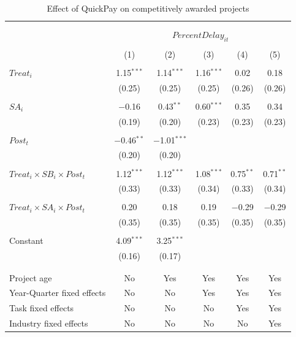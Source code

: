\documentclass[
]{article}
\begin{document}
\begin{table}[H] \centering 
  \caption{Effect of QuickPay on competitively awarded projects} 
  \label{} 
\small 
\begin{tabular}{@{\extracolsep{-2pt}}lccccc} 
\\[-1.8ex]\hline 
\hline \\[-1.8ex] 
\\[-1.8ex] & \multicolumn{5}{c}{$PercentDelay_{it}$  } \\ 
\\[-1.8ex] & (1) & (2) & (3) & (4) & (5)\\ 
\hline \\[-1.8ex] 
 $Treat_i$ & 1.15$^{***}$ & 1.14$^{***}$ & 1.16$^{***}$ & 0.02 & 0.18 \\ 
  & (0.25) & (0.25) & (0.25) & (0.26) & (0.26) \\ 
  & & & & & \\ 
 $SA_i$ & $-$0.16 & 0.43$^{**}$ & 0.60$^{***}$ & 0.35 & 0.34 \\ 
  & (0.19) & (0.20) & (0.23) & (0.23) & (0.23) \\ 
  & & & & & \\ 
 $Post_t$ & $-$0.46$^{**}$ & $-$1.01$^{***}$ &  &  &  \\ 
  & (0.20) & (0.20) &  &  &  \\ 
  & & & & & \\ 
 $Treat_i \times SB_i \times Post_t$ & 1.12$^{***}$ & 1.12$^{***}$ & 1.08$^{***}$ & 0.75$^{**}$ & 0.71$^{**}$ \\ 
  & (0.33) & (0.33) & (0.34) & (0.33) & (0.34) \\ 
  & & & & & \\ 
 $Treat_i \times SA_i \times Post_t$ & 0.20 & 0.18 & 0.19 & $-$0.29 & $-$0.29 \\ 
  & (0.35) & (0.35) & (0.35) & (0.35) & (0.35) \\ 
  & & & & & \\ 
 Constant & 4.09$^{***}$ & 3.25$^{***}$ &  &  &  \\ 
  & (0.16) & (0.17) &  &  &  \\ 
  & & & & & \\ 
\hline \\[-1.8ex] 
Project age & No & Yes & Yes & Yes & Yes \\ 
Year-Quarter fixed effects & No & No & Yes & Yes & Yes \\ 
Task fixed effects & No & No & No & Yes & Yes \\ 
Industry fixed effects & No & No & No & No & Yes \\ 

\end{tabular}
\end{table}
\end{document}
